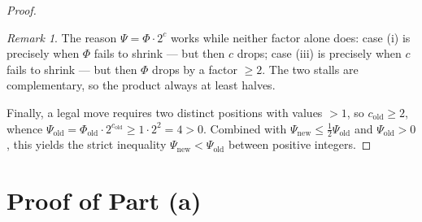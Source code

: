 \documentclass[11pt]{article}
\theoremstyle{plain}
\theoremstyle{definition}
\theoremstyle{remark}
\newtheorem*{remark}{Remark}
\begin{document}
\begin{proof}
\begin{remark}
The reason $\Psi=\Phi\cdot 2^c$ works while neither factor alone does: case
(i) is precisely when $\Phi$ fails to shrink --- but then $c$ drops; case
(iii) is precisely when $c$ fails to shrink --- but then $\Phi$ drops by a
factor $\ge2$. The two stalls are complementary, so the product always at
least halves.
\end{remark}

Finally, a legal move requires two distinct positions with values $>1$, so
$c_{\mathrm{old}}\ge 2$, whence
$\Psi_{\mathrm{old}}=\Phi_{\mathrm{old}}\cdot 2^{c_{\mathrm{old}}}\ge
1\cdot 2^2=4>0$. Combined with $\Psi_{\mathrm{new}}\le
\frac12\Psi_{\mathrm{old}}$ and $\Psi_{\mathrm{old}}>0$, this yields the
strict inequality $\Psi_{\mathrm{new}}<\Psi_{\mathrm{old}}$ between positive
integers.
\end{proof}

\section{Proof of Part (a)}
\end{document}
